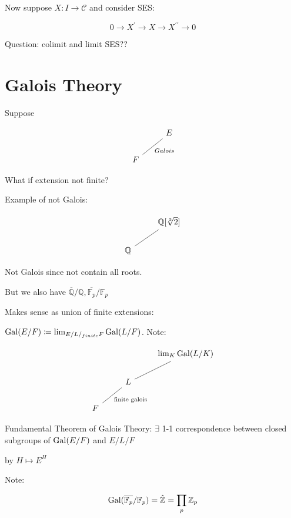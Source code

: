 \documentclass{article}
\theoremstyle{definition}
\begin{document}
Now suppose \(X : I \to \mathcal{C}\) and consider SES:

\[
    0 \to X^{\prime} \to X \to X^{\prime\prime} \to 0
\]

Question: colimit and limit SES??

\section*{Galois Theory}

Suppose

\[
    \begin{tikzcd}
        & E \ar[dl, no head, "Galois"] \\
        F &
    \end{tikzcd}
\]

What if extension not finite?

Example of not Galois:

\[
    \begin{tikzcd}
        & \mathbb{Q} [\sqrt[3]{2} ] \ar[dl, no head] \\
        \mathbb{Q} 
    \end{tikzcd}
\]

Not Galois since not contain all roots.

But we also have \(\overline{\mathbb{Q}} / \mathbb{Q}, \overline{\mathbb{F}_p} / \mathbb{F}_p  \) 

Makes sense as union of finite extensions:

\(\operatorname{Gal}(E / F) \coloneqq \lim_{E / L /_{finite} F} \operatorname{Gal}(L / F)\). Note:

\[
    \begin{tikzcd}
        & & \lim_K \Gal(L / K) \ar[dl, no head]\\
        & L \ar[dl, "\text{finite galois}", no head] & \\
        F
    \end{tikzcd}
\]

Fundamental Theorem of Galois Theory: \(\exists\) 1-1 correspondence between closed subgroups of \(\operatorname{Gal}(E / F)\) and \(E / L / F\)

by \(H \mapsto E^H\)

Note:

\[
    \operatorname{Gal}(\overline{\mathbb{F}_p} / \mathbb{F}_p) = \hat{\mathbb{Z}} = \prod_p \mathbb{Z}_p
\]
\end{document}
